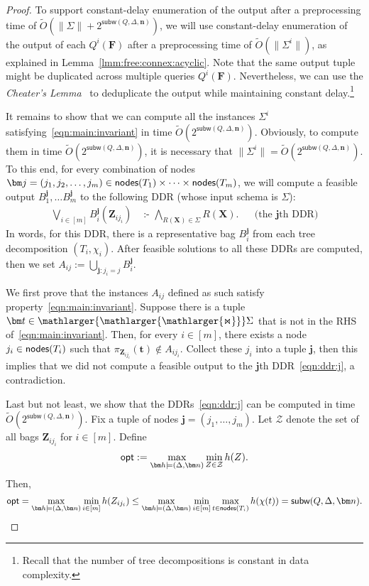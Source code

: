 \documentclass[10pt,a4paper]{article}
\newcommand{\norm}[1]{\|#1\|}
\newcommand{\opt}{\text{\sf opt}}
\newcommand{\calZ}{\mathcal Z}
\newcommand{\cd}{\text{ :- }}
\newcommand{\bigjoin}{\mathlarger{\mathlarger{\mathlarger{\Join}}}}
\newcommand{\nodes}{\text{\sf nodes}}
\newcommand{\subm}{\textsf{subw}}
\begin{document}
\begin{proof}
To support constant-delay enumeration of the output after a preprocessing time of $\tilde O(\norm{\Sigma} + 2^{\subm(Q, \Delta, \bm n)})$,
we will use constant-delay enumeration of the output of each $Q^i(\bm F)$
after a preprocessing time of $\tilde O(\norm{\Sigma^i})$, as explained in Lemma~\ref{lmm:free:connex:acyclic}.
Note that the same output tuple might be duplicated across multiple queries $Q^i(\bm F)$.
Nevertheless, we can use the {\em Cheater's Lemma}~\cite{10.1145/3450263} to deduplicate the output while maintaining constant delay.\footnote{Recall that the number of tree decompositions is constant in data complexity.}

  It remains to show that we can compute all the instances $\Sigma^i$
  satisfying~\eqref{eqn:main:invariant} in time \linebreak $\tilde O(2^{\subm(Q, \Delta, \bm n)})$.
  Obviously, to compute them in time $\tilde O(2^{\subm(Q, \Delta, \bm n)})$, it is
  necessary that $\norm{\Sigma^i} = \tilde O(2^{\subm(Q, \Delta, \bm n)})$. To this
  end, for every combination of nodes $\bm j = (j_1, j_2, \dots, j_m) \in \nodes(T_1) \times
  \cdots \times \nodes(T_m)$, we will compute a feasible output $B^{\bm j}_1, \dots B^{\bm
  j}_m$ to the following DDR (whose input schema is $\Sigma$):
  \begin{align}
     \bigvee_{i \in [m]} B^{\bm j}_i(\bm Z_{ij_i}) & \cd \bigwedge_{R(\bm X) \in \Sigma}R(\bm X).
     && \text{(the $\bm j$th DDR)}
     \label{eqn:ddr:j}
  \end{align}
  In words, for this DDR, there is a representative bag $B_i^{\bm j}$ from each tree decomposition
  $(T_i,\chi_i)$.
  After feasible solutions to all these DDRs are computed, then we set
  $A_{ij} := \bigcup_{\bm j : j_i = j} B_i^{\bm j}.$

  We first prove that the instances $A_{ij}$ defined as such
  satisfy property~\eqref{eqn:main:invariant}. Suppose there is a tuple $\bm t \in
  \bigjoin \Sigma$ that is not in the RHS of~\eqref{eqn:main:invariant}. Then, for
  every $i \in [m]$, there exists a node $j_i \in \nodes(T_i)$ such that $\pi_{\bm
  Z_{ij_i}}(\bm t) \not\in A_{ij_i}$. Collect these $j_i$ into a tuple $\bm j$, then this
  implies that we did not compute a feasible output to the $\bm j$th
  DDR~\eqref{eqn:ddr:j}, a contradiction.

  Last but not least, we show that the DDRs~\eqref{eqn:ddr:j} can be computed in time
  $\tilde O(2^{\subm(Q, \Delta, \bm n)})$.  Fix a tuple of nodes $\bm j = (j_1, \dots, j_m)$.
  Let $\calZ$ denote the set of all bags $\bm Z_{ij_i}$ for $i \in [m]$.
  Define
  \[ \opt := \max_{\bm h \models (\Delta, \bm n)} \min_{Z \in \calZ} h(Z).  \]
  Then,
  \begin{align*}
    \opt = \max_{\bm h \models (\Delta, \bm n)} \min_{i \in [m]} h(Z_{ij_i})
         \leq \max_{\bm h \models (\Delta, \bm n)} \min_{i \in [m]} \max_{t \in \nodes(T_i)} h(\chi(t))
         = \subm(Q, \Delta, \bm n).
  \end{align*}


\end{proof}
\end{document}
